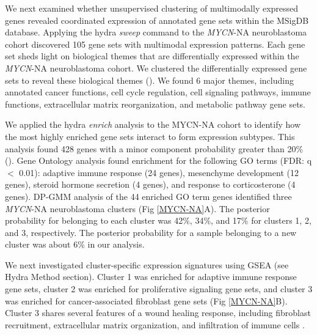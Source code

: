 \documentclass[10pt,letterpaper]{article}
\begin{document}
We next examined whether unsupervised clustering of multimodally expressed genes revealed coordinated expression of annotated gene sets within the MSigDB database. Applying the hydra \textit{sweep} command to the \textit{MYCN}-NA neuroblastoma cohort discovered 105 gene sets with multimodal expression patterns. Each gene set sheds light on biological themes that are differentially expressed within the \textit{MYCN}-NA neuroblastoma cohort. We clustered the differentially expressed gene sets to reveal these biological themes (). We found 6 major themes, including annotated cancer functions, cell cycle regulation, cell signaling pathways, immune functions, extracellular matrix reorganization, and metabolic pathway gene sets.

We applied the hydra \textit{enrich} analysis to the MYCN-NA cohort to identify how the most highly enriched gene sets interact to form expression subtypes. This analysis found 428 genes with a minor component probability greater than 20\% (). Gene Ontology analysis found enrichment for the following GO terms (FDR: q $<$ 0.01): adaptive immune response (24 genes), mesenchyme development (12 genes), steroid hormone secretion (4 genes), and response to corticosterone (4 genes). DP-GMM analysis of the 44 enriched GO term genes identified three \textit{MYCN}-NA neuroblastoma clusters (Fig \ref{MYCN-NA}A). The posterior probability for belonging to each cluster was 42\%, 34\%, and 17\% for clusters 1, 2, and 3, respectively. The posterior probability for a sample belonging to a new cluster was about 6\% in our analysis.

We next investigated cluster-specific expression signatures using GSEA (see Hydra Method section). Cluster 1 was enriched for adaptive immune response gene sets, cluster 2 was enriched for proliferative signaling gene sets, and cluster 3 was enriched for cancer-associated fibroblast gene sets (Fig \ref{MYCN-NA}B). Cluster 3 shares several features of a wound healing response, including fibroblast recruitment, extracellular matrix organization, and infiltration of immune cells \cite{fosterEvolvingRelationshipWound}.
\end{document}
